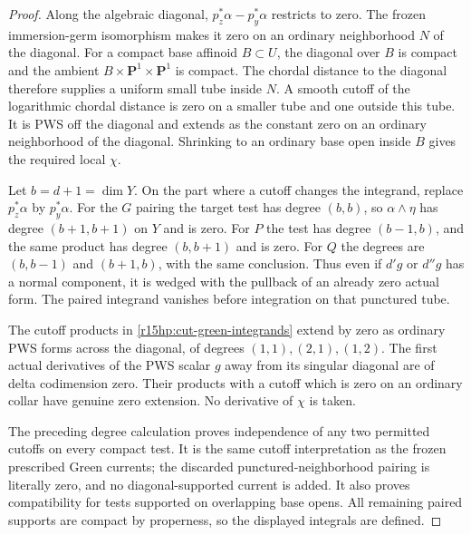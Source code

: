 \begin{proof}
Along the algebraic diagonal, $p_z^*\alpha-p_y^*\alpha$
restricts to zero.  The frozen immersion-germ isomorphism makes
it zero on an ordinary neighborhood $N$ of the diagonal.
For a compact base affinoid $B\subset U$, the diagonal over
$B$ is compact and the ambient $B\times\mathbf P^1\times
\mathbf P^1$ is compact.  The chordal distance to the diagonal
therefore supplies a uniform small tube inside $N$.  A smooth
cutoff of the logarithmic chordal distance is zero on a smaller
tube and one outside this tube.  It is PWS off the diagonal
and extends as the constant zero on an ordinary neighborhood
of the diagonal.  Shrinking to an ordinary base open inside
$B$ gives the required local $\chi$.

Let $b=d+1=\dim Y$.  On the part where a cutoff changes the
integrand, replace $p_z^*\alpha$ by $p_y^*\alpha$.  For the
$G$ pairing the target test has degree $(b,b)$, so
$\alpha\wedge\eta$ has degree $(b+1,b+1)$ on $Y$ and is zero.
For $P$ the test has degree $(b-1,b)$, and the same product has
degree $(b,b+1)$ and is zero.  For $Q$ the degrees are
$(b,b-1)$ and $(b+1,b)$, with the same conclusion.  Thus even
if $d'g$ or $d''g$ has a normal component, it is wedged with
the pullback of an already zero actual form.  The paired
integrand vanishes before integration on that punctured tube.

The cutoff products in \eqref{r15hp:cut-green-integrands} extend
by zero as ordinary PWS forms across the diagonal, of degrees
$(1,1),(2,1),(1,2)$.  The first actual derivatives of the PWS
scalar $g$ away from its singular diagonal are of delta
codimension zero.  Their products with a cutoff which is zero
on an ordinary collar have genuine zero extension.  No
derivative of $\chi$ is taken.

The preceding degree calculation proves independence of any
two permitted cutoffs on every compact test.  It is the same
cutoff interpretation as the frozen prescribed Green currents;
the discarded punctured-neighborhood pairing is literally zero,
and no diagonal-supported current is added.  It also proves
compatibility for tests supported on overlapping base opens.
All remaining paired supports are compact by properness, so
the displayed integrals are defined.
\end{proof}

